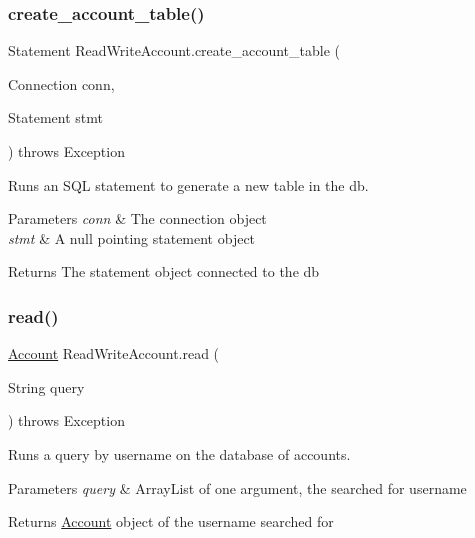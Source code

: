 \subsubsection{\texorpdfstring{create\+\_\+account\+\_\+table()}{create\_account\_table()}}
{\footnotesize\ttfamily Statement Read\+Write\+Account.\+create\+\_\+account\+\_\+table (\begin{DoxyParamCaption}\item[{Connection}]{conn,  }\item[{Statement}]{stmt }\end{DoxyParamCaption}) throws Exception}



Runs an S\+QL statement to generate a new table in the db. 


\begin{DoxyParams}{Parameters}
{\em conn} & The connection object \\
\hline
{\em stmt} & A null pointing statement object \\
\hline
\end{DoxyParams}
\begin{DoxyReturn}{Returns}
The statement object connected to the db 
\end{DoxyReturn}
\mbox{\label{class_read_write_account_adb0ddd0ce6641f10c1b9220c670552e9}} 
\subsubsection{\texorpdfstring{read()}{read()}}
{\footnotesize\ttfamily \hyperlink{class_account}{Account} Read\+Write\+Account.\+read (\begin{DoxyParamCaption}\item[{String}]{query }\end{DoxyParamCaption}) throws Exception}



Runs a query by username on the database of accounts. 


\begin{DoxyParams}{Parameters}
{\em query} & Array\+List of one argument, the searched for username \\
\hline
\end{DoxyParams}
\begin{DoxyReturn}{Returns}
\hyperlink{class_account}{Account} object of the username searched for 
\end{DoxyReturn}
\mbox{\label{class_read_write_account_af566baef11164e567122f337ce3dc2cc}} 
